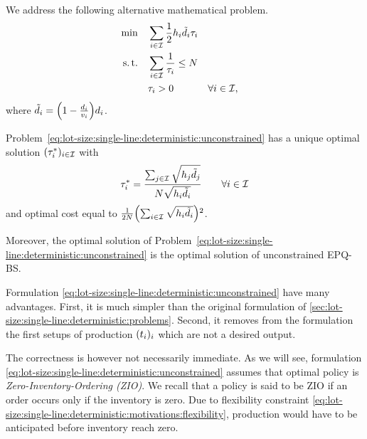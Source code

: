 We address the following alternative mathematical problem.
\begin{subequations}\label{eq:lot-size:single-line:deterministic:unconstrained}
  \begin{align}
  \min\quad & \displaystyle\sum_{i\in\mathcal{I}} \frac{1}{2}h_i\tilde{d}_i\tau_i
  \label{eq:lot-size:single-line:deterministic:unconstrained:objective}
  \\
  \operatorname{s.t.}\quad  & \displaystyle\sum_{i\in\mathcal{I}} \frac{1}{\tau_i} \le N
  \label{eq:lot-size:single-line:deterministic:unconstrained:flexibility}
  \\
       & \tau_i > 0 && \forall i\in\mathcal{I},
  \label{eq:lot-size:single-line:deterministic:unconstrained:positivity}
  \end{align}
\end{subequations}
where $\tilde{\demand}_i=\bracket{1-\frac{\demand_i}{\rate_i}}\demand_i$.

\begin{thm}\label{thm:lot-size:single-line:deterministic:unconstrained:optimality}
Problem~\eqref{eq:lot-size:single-line:deterministic:unconstrained} has a unique optimal solution $(\tau_i^*)_{i\in\mathcal{I}}$ with
\begin{equation}
  \tau_i^*= \frac{\sum_{j\in\mathcal{I}}\sqrt{h_j\tilde{d}_j}}{N\sqrt{h_i\tilde{d}_i}}\qquad\forall i\in\mathcal{I}
\end{equation}
and optimal cost equal to $\frac{1}{2\nbsetups}\bracket{\sum_{i\in\REF}\sqrt{\holding_i\tilde{\demand_i}}}^2$.

Moreover, the optimal solution of Problem~\eqref{eq:lot-size:single-line:deterministic:unconstrained} is the optimal solution of unconstrained EPQ-BS.
\end{thm}


Formulation \eqref{eq:lot-size:single-line:deterministic:unconstrained} have many advantages.
First, it is much simpler than the original formulation of \cref{sec:lot-size:single-line:deterministic:problems}.
Second, it removes from the formulation the first setups of production $\bracket{t_i}_i$ which are not a desired output.


The correctness is however not necessarily immediate.
As we will see, formulation \eqref{eq:lot-size:single-line:deterministic:unconstrained} assumes that optimal policy is \emph{Zero-Inventory-Ordering (ZIO)}.
We recall that a policy is said to be ZIO if an order occurs only if the inventory is zero.
Due to flexibility constraint \eqref{eq:lot-size:single-line:deterministic:motivations:flexibility}, production would have to be anticipated before inventory reach zero.

